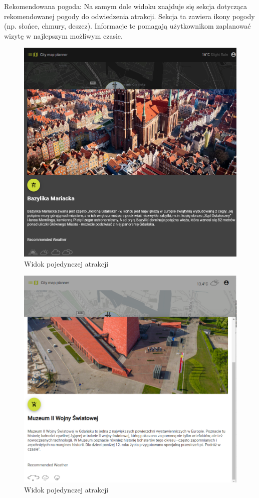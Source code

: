 Rekomendowana pogoda:
Na samym dole widoku znajduje się sekcja dotycząca rekomendowanej 
pogody do odwiedzenia atrakcji. Sekcja ta zawiera ikony pogody (np. słońce, chmury, deszcz). 
Informacje te pomagają użytkownikom zaplanować wizytę w najlepszym możliwym czasie.
\begin{figure}[H]
        \centering
        \includegraphics[width=1\textwidth]{attachments/atrakcjawidok}
        \caption{Widok pojedynczej atrakcji}
        \label{fig:mapawidok}
\end{figure}
\begin{figure}[H]
    \centering
    \includegraphics[width=1\textwidth]{attachments/atrakcjawidok-light}
    \caption{Widok pojedynczej atrakcji}
    \label{fig:mapawidok}
\end{figure}
